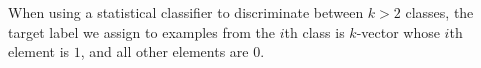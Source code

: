 %
When using a statistical classifier to discriminate between $k>2$ classes, the target label we assign to examples from the $i$th class is $k$-vector whose $i$th element is $1$, and all other elements are $0$.